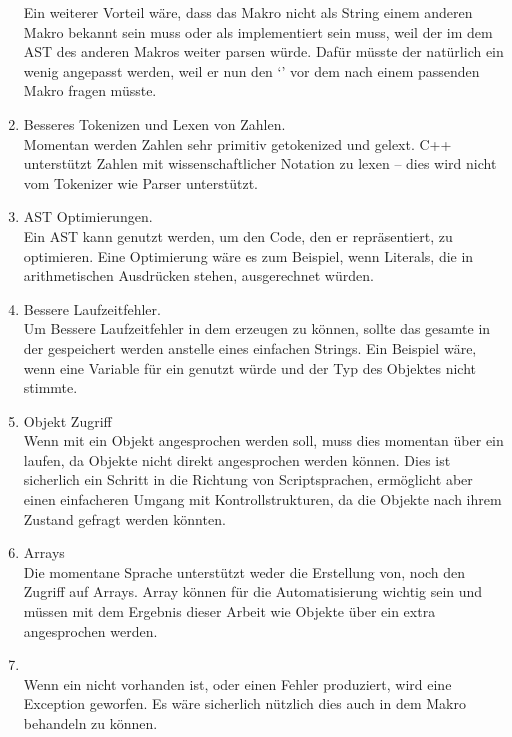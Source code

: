 \begin{enumerate}[ref=\autoref{ssec:Ausblick}: Punkt \arabic*]
        Ein weiterer Vorteil wäre, dass das Makro nicht als String einem anderen Makro bekannt sein muss oder als  implementiert sein muss, weil der  im dem AST des anderen Makros weiter parsen würde. Dafür müsste der  natürlich ein wenig angepasst werden, weil er nun den `' vor dem  nach einem passenden Makro fragen müsste.
      \item Besseres Tokenizen und Lexen von Zahlen.\label{enum:lexnumber}\\
        Momentan werden Zahlen sehr primitiv getokenized und gelext. C++ unterstützt Zahlen mit wissenschaftlicher Notation zu lexen -- dies wird nicht vom Tokenizer wie Parser unterstützt.
      \item AST Optimierungen.\\
        Ein AST kann genutzt werden, um den Code, den er repräsentiert, zu optimieren. Eine Optimierung wäre es zum Beispiel, wenn Literals, die in arithmetischen Ausdrücken stehen, ausgerechnet würden.
      \item Bessere Laufzeitfehler.\label{enum:betterruntimeerrors}\\
        Um Bessere Laufzeitfehler in dem  erzeugen zu können, sollte das gesamte  in der  gespeichert werden anstelle eines einfachen Strings. Ein Beispiel wäre, wenn eine Variable für ein  genutzt würde und der Typ des  Objektes nicht stimmte.
      \item Objekt Zugriff\\
        Wenn mit ein Objekt angesprochen werden soll, muss dies momentan über ein  laufen, da Objekte nicht direkt angesprochen werden können. Dies ist sicherlich ein Schritt in die Richtung von Scriptsprachen, ermöglicht aber einen einfacheren Umgang mit Kontrollstrukturen, da die Objekte nach ihrem Zustand gefragt werden könnten.
      \item Arrays\\
        Die momentane Sprache unterstützt weder die Erstellung von, noch den Zugriff auf Arrays. Array können für die Automatisierung wichtig sein und müssen mit dem Ergebnis dieser Arbeit wie Objekte über ein extra  angesprochen werden.
      \item {}\\
        Wenn ein  nicht vorhanden ist, oder einen Fehler produziert, wird eine Exception geworfen. Es wäre sicherlich nützlich dies auch in dem Makro behandeln zu können.
    \end{enumerate}

